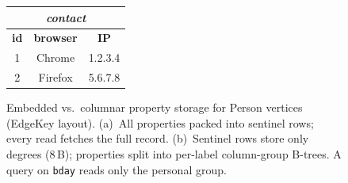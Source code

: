 \begin{figure}[t]
{\begin{minipage}[t]{0.57\textwidth}
\begin{tabular}{|c|c|c|}
      \hline
    \end{tabular}%
    \quad
    \begin{tabular}{|c|c|c|}
      \hline
      \multicolumn{3}{|c|}{\textit{contact}} \\
      \hline
      \textbf{id} & \textbf{browser} & \textbf{IP} \\
      \hline
      1 & Chrome & 1.2.3.4 \\
      2 & Firefox & 5.6.7.8 \\
      \hline
    \end{tabular}
    \caption*{\textbf{(b)} Columnar: structural + column-group B-trees}
  \end{minipage}%
  }%

  \caption{Embedded vs.\ columnar property storage for Person vertices (EdgeKey layout).
  (a)~All properties packed into sentinel rows; every read fetches the full record.
  (b)~Sentinel rows store only degrees (8\,B); properties split into per-label column-group B-trees.
  A query on \texttt{bday} reads only the \colorbox{blue!12}{personal} group.}
  \label{fig:schema:property}
\end{figure}
